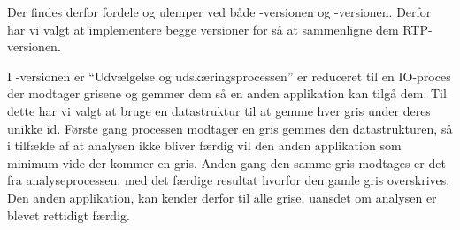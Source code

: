 Der findes derfor fordele og ulemper ved både -versionen og -versionen. Derfor har vi valgt at implementere begge versioner for så at sammenligne dem RTP-versionen.

I -versionen er ``Udvælgelse og udskæringsprocessen'' er reduceret til en IO-proces der modtager grisene og gemmer dem så en anden applikation kan tilgå dem. Til dette har vi valgt at bruge en  datastruktur til at gemme  hver gris under deres unikke id. Første gang processen modtager en gris gemmes den datastrukturen, så i tilfælde af at analysen ikke bliver færdig vil den anden applikation som minimum vide der kommer en gris. Anden gang den samme gris modtages er det fra analyseprocessen, med det færdige resultat hvorfor  den gamle gris overskrives. Den anden applikation, kan kender derfor til alle grise, uansdet om analysen er blevet rettidigt færdig.


